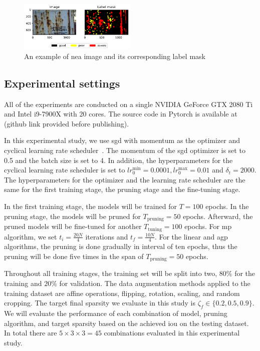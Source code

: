 \documentclass[mathematics,article,submit,pdftex,moreauthors]{Definitions/mdpi}
\begin{document}
\begin{figure}[htbp]
    \begin{center}
    \includegraphics[width=0.5\textwidth]{figures/nea-example.pdf}
    \caption{An example of \ac{nea} image and its corresponding label mask}
    \label{fig:dataset:nea-example}
    \end{center}
\end{figure}


\subsection{Experimental settings}
All of the experiments are conducted on a 
single NVIDIA GeForce GTX 2080 Ti and
Intel i9-7900X with 20 cores. The source code in Pytorch is 
available at (github link provided before publishing).

In this experimental study, we use \ac{sgd} with
momentum as the optimizer and cyclical learning
rate scheduler~\cite{Smith2017}.
The momentum of the \ac{sgd} optimizer is set to 0.5
and the batch size is set to 4.
In addition, the hyperparameters for the cyclical learning
rate scheduler is set to $lr^{\min}_0=0.0001, lr^{\max}_0=0.01$ 
and $\delta_t=2000$. The hyperparameters for the optimizer and 
the learning rate scheduler are the same for the first
training stage, the pruning stage and the fine-tuning stage.

In the first training stage, the models
will be trained for $T=100$ epochs. In the pruning stage,
the models will be pruned for $T_{\text{pruning}}=50$ epochs.
Afterward, the pruned models will be fine-tuned for another 
$T_{\text{tuning}}=100$ epochs. For \ac{mp} algorithm,
we set $t_i=\frac{20N}{4}$ iterations and $t_f=\frac{10N}{4}$.
For the linear and \ac{agp} algorithms, the pruning
is done gradually in interval of ten epochs, thus the pruning
will be done five times in the span of $T_{\text{pruning}}=50$ epochs.

Throughout all training stages,
the training set will be split into two, $80\%$ for the 
training and $20\%$ for validation. The data augmentation
methods applied to the training dataset are affine operations,
flipping, rotation, scaling, and random cropping.
The target final sparsity we evaluate in this study
is $\zeta_f \in \{0.2, 0.5, 0.9\}$. We will evaluate the performance
of each combination of model, pruning algorithm, and
target sparsity based on the achieved \ac{iou} on
the testing dataset. In total there are $5\times 3\times 3=45$
combinations evaluated in this experimental study.
\end{document}
